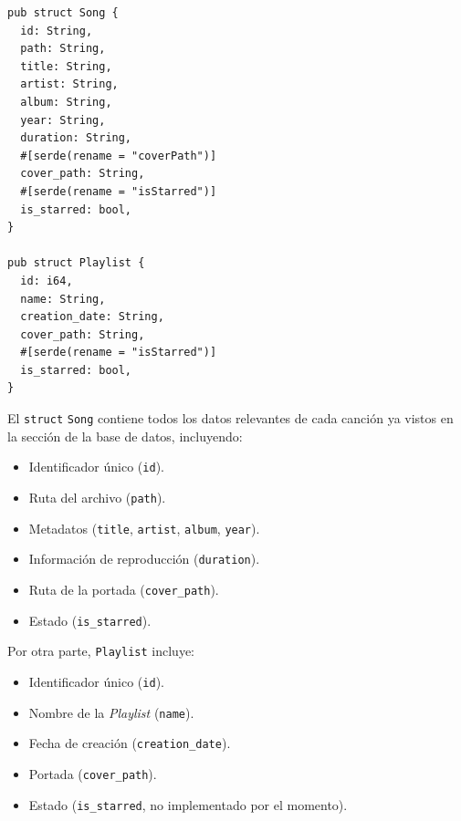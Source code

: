 \documentclass[11pt, a4paper]{article}
\begin{document}
            \begin{lstlisting}[caption={structs Song y Playlist}]
pub struct Song {
  id: String,
  path: String,
  title: String,
  artist: String,
  album: String,
  year: String,
  duration: String,
  #[serde(rename = "coverPath")]
  cover_path: String,
  #[serde(rename = "isStarred")]
  is_starred: bool,
}

pub struct Playlist {
  id: i64,
  name: String,
  creation_date: String,
  cover_path: String,
  #[serde(rename = "isStarred")]
  is_starred: bool,
}
            \end{lstlisting}

            El \verb|struct| \verb|Song| contiene todos los datos relevantes de cada canción ya vistos en la sección de la base de datos, incluyendo:

            \begin{itemize}
              \item Identificador único (\verb|id|).
              \item Ruta del archivo (\verb|path|).
              \item Metadatos (\verb|title|, \verb|artist|, \verb|album|, \verb|year|).
              \item Información de reproducción (\verb|duration|).
              \item Ruta de la portada (\verb|cover_path|).
              \item Estado (\verb|is_starred|).
            \end{itemize}

            Por otra parte, \verb|Playlist| incluye:

            \begin{itemize}
              \item Identificador único (\verb|id|).
              \item Nombre de la \textit{Playlist} (\verb|name|).
              \item Fecha de creación (\verb|creation_date|).
              \item Portada (\verb|cover_path|).
              \item Estado (\verb|is_starred|, no implementado por el momento).
            \end{itemize}
\end{document}
